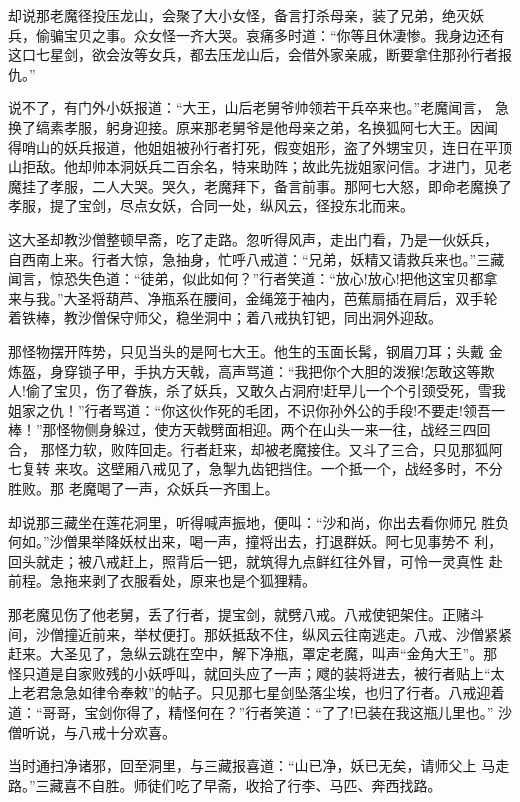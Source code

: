 却说那老魔径投压龙山，会聚了大小女怪，备言打杀母亲，装了兄弟，绝灭妖
兵，偷骗宝贝之事。众女怪一齐大哭。哀痛多时道：“你等且休凄惨。我身边还有
这口七星剑，欲会汝等女兵，都去压龙山后，会借外家亲戚，断要拿住那孙行者报
仇。”

说不了，有门外小妖报道：“大王，山后老舅爷帅领若干兵卒来也。”老魔闻言，
急换了缟素孝服，躬身迎接。原来那老舅爷是他母亲之弟，名换狐阿七大王。因闻
得哨山的妖兵报道，他姐姐被孙行者打死，假变姐形，盗了外甥宝贝，连日在平顶
山拒敌。他却帅本洞妖兵二百余名，特来助阵；故此先拢姐家问信。才进门，见老
魔挂了孝服，二人大哭。哭久，老魔拜下，备言前事。那阿七大怒，即命老魔换了
孝服，提了宝剑，尽点女妖，合同一处，纵风云，径投东北而来。

这大圣却教沙僧整顿早斋，吃了走路。忽听得风声，走出门看，乃是一伙妖兵，
自西南上来。行者大惊，急抽身，忙呼八戒道：“兄弟，妖精又请救兵来也。”三藏
闻言，惊恐失色道：“徒弟，似此如何？”行者笑道：“放心!放心!把他这宝贝都拿
来与我。”大圣将葫芦、净瓶系在腰间，金绳笼于袖内，芭蕉扇插在肩后，双手轮
着铁棒，教沙僧保守师父，稳坐洞中；着八戒执钉钯，同出洞外迎敌。

那怪物摆开阵势，只见当头的是阿七大王。他生的玉面长髯，钢眉刀耳；头戴
金炼盔，身穿锁子甲，手执方天戟，高声骂道：“我把你个大胆的泼猴!怎敢这等欺
人!偷了宝贝，伤了眷族，杀了妖兵，又敢久占洞府!赶早儿一个个引颈受死，雪我
姐家之仇！”行者骂道：“你这伙作死的毛团，不识你孙外公的手段!不要走!领吾一
棒！”那怪物侧身躲过，使方天戟劈面相迎。两个在山头一来一往，战经三四回合，
那怪力软，败阵回走。行者赶来，却被老魔接住。又斗了三合，只见那狐阿七复转
来攻。这壁厢八戒见了，急掣九齿钯挡住。一个抵一个，战经多时，不分胜败。那
老魔喝了一声，众妖兵一齐围上。

却说那三藏坐在莲花洞里，听得喊声振地，便叫：“沙和尚，你出去看你师兄
胜负何如。”沙僧果举降妖杖出来，喝一声，撞将出去，打退群妖。阿七见事势不
利，回头就走；被八戒赶上，照背后一钯，就筑得九点鲜红往外冒，可怜一灵真性
赴前程。急拖来剥了衣服看处，原来也是个狐狸精。

那老魔见伤了他老舅，丢了行者，提宝剑，就劈八戒。八戒使钯架住。正赌斗
间，沙僧撞近前来，举杖便打。那妖抵敌不住，纵风云往南逃走。八戒、沙僧紧紧
赶来。大圣见了，急纵云跳在空中，解下净瓶，罩定老魔，叫声“金角大王”。那
怪只道是自家败残的小妖呼叫，就回头应了一声；飕的装将进去，被行者贴上“太
上老君急急如律令奉敕”的帖子。只见那七星剑坠落尘埃，也归了行者。八戒迎着
道：“哥哥，宝剑你得了，精怪何在？”行者笑道：“了了!已装在我这瓶儿里也。”
沙僧听说，与八戒十分欢喜。

当时通扫净诸邪，回至洞里，与三藏报喜道：“山已净，妖已无矣，请师父上
马走路。”三藏喜不自胜。师徒们吃了早斋，收拾了行李、马匹、奔西找路。

